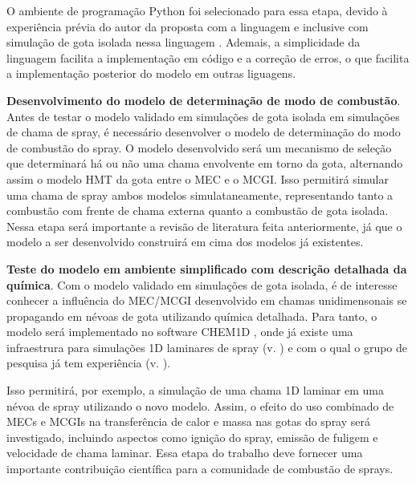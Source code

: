 O ambiente de programação Python foi selecionado para essa etapa, devido à experiência prévia do autor da proposta com a linguagem e inclusive com simulação de gota isolada nessa linguagem \cite{HenningsJ2024MT}.
Ademais, a simplicidade da linguagem facilita a implementação em código e a correção de erros, o que facilita a implementação posterior do modelo em outras liguagens.

\textbf{Desenvolvimento do modelo de determinação de modo de combustão}.
Antes de testar o modelo validado em simulações de gota isolada em simulações de chama de spray, é necessário desenvolver o modelo de determinação do modo de combustão do spray.
O modelo desenvolvido será um mecanismo de seleção que determinará há ou não uma chama envolvente em torno da gota, alternando assim o modelo HMT da gota entre o MEC e o MCGI.
Isso permitirá simular uma chama de spray ambos modelos simulataneamente, representando tanto a combustão com frente de chama externa quanto a combustão de gota isolada.
Nessa etapa será importante a revisão de literatura feita anteriormente, já que o modelo a ser desenvolvido construirá em cima dos modelos já existentes.


\textbf{Teste do modelo em ambiente simplificado com descrição detalhada da química}.
Com o modelo validado em simulações de gota isolada, é de interesse conhecer a influência do MEC/MCGI desenvolvido em chamas unidimensonais se propagando em névoas de gota utilizando química detalhada.
Para tanto, o modelo será implementado no software CHEM1D \cite{Sommers1994PhD}, onde já existe uma infraestrura para simulações 1D laminares de spray (v. \cite{Sommers1994PhD,vanOijen2002CTM,vanOijen2016PECS, SacomanoF2018CTM,SacomanoF2021Fluids}) e com o qual o grupo de pesquisa já tem experiência (v. \cite{SacomanoF2018CTM,SacomanoF2019IJHMT,SacomanoF2021Fluids,SacomanoF2024CF,SacomanoF2025CF}).

Isso permitirá, por exemplo, a simulação de uma chama 1D laminar em uma névoa de spray utilizando o novo modelo.
Assim, o efeito do uso combinado de MECs e MCGIs na transferência de calor e massa nas gotas do spray será investigado, incluindo aspectos como ignição do spray, emissão de fuligem e velocidade de chama laminar.
Essa etapa do trabalho deve fornecer uma importante contribuição científica para a comunidade de combustão de sprays.

